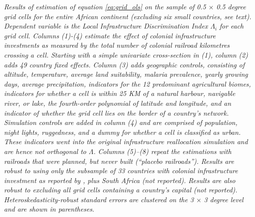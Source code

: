 \documentclass[11pt, oneside]{article}   	%
\newcommand{\mysubcaption}[1]{
\justify
\begin{spacing}{0.7}
\textit{\footnotesize #1}
\end{spacing}}
\begin{document}
\begin{table}[!ph]
\mysubcaption{Results of estimation of equation \eqref{eq:grid_ols} on the sample of 0.5 $\times$ 0.5 degree grid cells for the entire African continent (excluding six small countries, see text). Dependent variable is the Local Infrastructure Discrimination Index $\Lambda_{i}$ for each grid cell. Columns (1)-(4) estimate the effect of colonial infrastructure investments as measured by the total number of colonial railroad kilometres crossing a cell. Starting with a simple univariate cross-section in (1), column (2) adds 49 country fixed effects. Column (3) adds geographic controls, consisting of altitude, temperature, average land suitability, malaria prevalence, yearly growing days, average precipitation, indicators for the 12 predominant agricultural biomes, indicators for whether a cell is within 25 KM of a natural harbour, navigable river, or lake, the fourth-order polynomial of latitude and longitude, and an indicator of whether the grid cell lies on the border of a country's network. Simulation controls are added in column (4) and are comprised of population, night lights, ruggedness, and a dummy for whether a cell is classified as urban. These indicators went into the original infrastructure reallocation simulation and are hence not orthogonal to $\Lambda$. Columns (5)--(8) repeat the estimations with railroads that were planned, but never built (``placebo railroads''). Results are robust to using only the subsample of 33 countries with colonial infrastructure investment as reported by \cite{Jedwab_PermanentEffectsTransportation_2016a}, plus South Africa (not reported). Results are also robust to excluding all grid cells containing a country's capital (not reported). Heteroskedasticity-robust standard errors are clustered on the 3 $\times$ 3 degree level and are shown in parentheses.}
\end{table}
\end{document}
